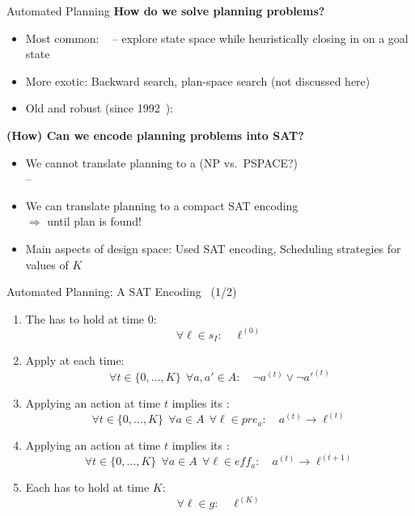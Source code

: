 \documentclass[t,english]{sdqbeamer}
\begin{document}
\begin{frame}{Automated Planning}
	\textbf{How do we solve planning problems?}
	\begin{itemize}
		\item Most common: ~\cite{helmert2006fast} -- explore state space while heuristically closing in on a goal state
		\item More exotic: Backward search, plan-space search (not discussed here)
		\item Old and robust (since 1992~\cite{kautz1992planning}): 
	\end{itemize}
	\vspace*{5mm}
	\pause
	\textbf{(How) Can we encode planning problems into SAT?}
	\pause
	\begin{itemize}
		\item We cannot translate planning to a  (NP vs.~PSPACE?)\\
		-- 
		\item We can translate planning to a compact SAT encoding 
		\\$\Rightarrow$  until plan is found!
		\item Main aspects of design space: Used SAT encoding, Scheduling strategies for values of $K$
	\end{itemize}
\end{frame}

\newcommand{\attime}[2]{{#1}^{(#2)}}

\begin{frame}{Automated Planning: A SAT Encoding~\cite{kautz1996pushing} (1/2)}
	\begin{enumerate}
		\item The  has to hold at time $0$:\quad{}
		\[ \forall \ell \in s_I :\quad \attime{\ell}{0} \]
		\pause
		\item Apply  at each time:\quad{}
		\[ \forall t \in \{0,\ldots,K\}~~\forall a,a' \in A :\quad \neg \attime{a}{t} \vee \neg \attime{a'}{t} \]
		\pause
		\item Applying an action at time $t$ implies its :
		\[ \forall t \in \{0,\ldots,K\}~~\forall a \in A~~\forall \ell \in pre_a :\quad \attime{a}{t} \rightarrow \attime{\ell}{t} \]
		\pause
		\item Applying an action at time $t$ implies its :
		\[ \forall t \in \{0,\ldots,K\}~~\forall a \in A~~\forall \ell \in eff_a :\quad \attime{a}{t} \rightarrow \attime{\ell}{t+1} \]
		\pause
		\item Each  has to hold at time $K$:
		\[ \forall \ell \in g :\quad \attime{\ell}{K} \]
	\end{enumerate}
\end{frame}
\end{document}
